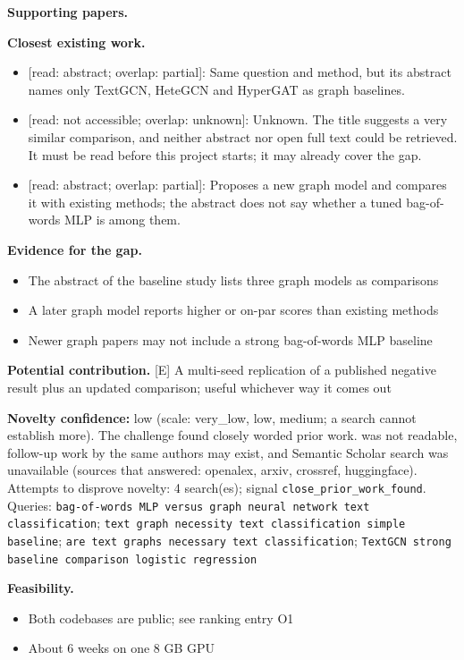 \documentclass[11pt,a4paper]{article}
\begin{document}
\textbf{Supporting papers.} \cite{galke2022,donabauer2025,wang2024,rizvi2025}

\textbf{Closest existing work.}
\begin{itemize}
\item \cite{galke2022} [read: abstract; overlap: partial]: Same question and method, but its abstract names only TextGCN, HeteGCN and HyperGAT as graph baselines.
\item \cite{abdalla2023} [read: not accessible; overlap: unknown]: Unknown. The title suggests a very similar comparison, and neither abstract nor open full text could be retrieved. It must be read before this project starts; it may already cover the gap.
\item \cite{donabauer2025} [read: abstract; overlap: partial]: Proposes a new graph model and compares it with existing methods; the abstract does not say whether a tuned bag-of-words MLP is among them.
\end{itemize}

\textbf{Evidence for the gap.}
\begin{itemize}
\item [V] The abstract of the baseline study lists three graph models as comparisons \cite{galke2022}
\item [V] A later graph model reports higher or on-par scores than existing methods \cite{donabauer2025}
\item [S] Newer graph papers may not include a strong bag-of-words MLP baseline
\end{itemize}

\textbf{Potential contribution.} [E] A multi-seed replication of a published negative result plus an updated comparison; useful whichever way it comes out

\textbf{Novelty confidence:} low (scale: very\_low, low, medium; a search cannot establish more). The challenge found closely worded prior work. \cite{abdalla2023} was not readable, follow-up work by the same authors may exist, and Semantic Scholar search was unavailable (sources that answered: openalex, arxiv, crossref, huggingface).
Attempts to disprove novelty: 4 search(es); signal \texttt{close\_prior\_work\_found}. Queries: \texttt{bag-of-words MLP versus graph neural network text classification}; \texttt{text graph necessity text classification simple baseline}; \texttt{are text graphs necessary text classification}; \texttt{TextGCN strong baseline comparison logistic regression}

\textbf{Feasibility.}
\begin{itemize}
\item [V] Both codebases are public; see ranking entry O1
\item [E] About 6 weeks on one 8 GB GPU
\end{itemize}
\end{document}
